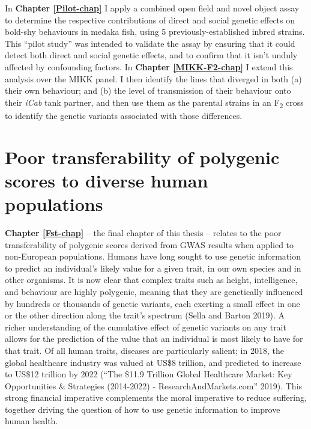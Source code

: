 \documentclass[
]{book}
\begin{document}
In \textbf{Chapter \ref{Pilot-chap}} I apply a combined open field and novel object assay to determine the respective contributions of direct and social genetic effects on bold-shy behaviours in medaka fish, using 5 previously-established inbred strains. This ``pilot study'' was intended to validate the assay by ensuring that it could detect both direct and social genetic effects, and to confirm that it isn't unduly affected by confounding factors. In \textbf{Chapter \ref{MIKK-F2-chap}} I extend this analysis over the MIKK panel. I then identify the lines that diverged in both (a) their own behaviour; and (b) the level of transmission of their behaviour onto their \emph{\textcolor{iCab_424B4D}{iCab}} tank partner, and then use them as the parental strains in an F\textsubscript{2} cross to identify the genetic variants associated with those differences.

\hypertarget{poor-transferability-of-polygenic-scores-to-diverse-human-populations}{%
\section{Poor transferability of polygenic scores to diverse human populations}\label{poor-transferability-of-polygenic-scores-to-diverse-human-populations}}

\textbf{Chapter \ref{Fst-chap}} -- the final chapter of this thesis -- relates to the poor transferability of polygenic scores derived from GWAS results when applied to non-European populations. Humans have long sought to use genetic information to predict an individual's likely value for a given trait, in our own species and in other organisms. It is now clear that complex traits such as height, intelligence, and behaviour are highly polygenic, meaning that they are genetically influenced by hundreds or thousands of genetic variants, each exerting a small effect in one or the other direction along the trait's spectrum (Sella and Barton 2019). A richer understanding of the cumulative effect of genetic variants on any trait allows for the prediction of the value that an individual is most likely to have for that trait. Of all human traits, diseases are particularly salient; in 2018, the global healthcare industry was valued at US\$8 trillion, and predicted to increase to US\$12 trillion by 2022 ({``The \$11.9 {Trillion Global Healthcare Market}: {Key Opportunities} \& {Strategies} (2014-2022) - {ResearchAndMarkets}.com''} 2019). This strong financial imperative complements the moral imperative to reduce suffering, together driving the question of how to use genetic information to improve human health.
\end{document}
